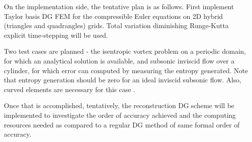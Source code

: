 \documentclass[11pt]{article}
\begin{document}
On the implementation side, the tentative plan is as follows. First implement Taylor basis DG FEM for the compressible Euler equations on 2D hybrid (triangles and quadrangles) grids. Total variation diminishing Runge-Kutta explicit time-stepping will be used.

Two test cases are planned - the isentropic vortex problem on a periodic domain, for which an analytical solution is available, and subsonic inviscid flow over a cylinder, for which error can computed by measuring the entropy generated. Note that entropy generation should be zero for an ideal inviscid subsonic flow. Also, curved elements are necessary for this case \cite{bassi_dgeuler}.

Once that is accomplished, tentatively, the reconstruction DG scheme will be implemented to investigate the order of accuracy achieved and the computing resources needed as compared to a regular DG method of same formal order of accuracy.


\end{document}
